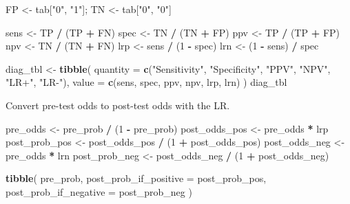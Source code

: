 \documentclass[
]{article}
\newenvironment{Shaded}{\begin{snugshade}}{\end{snugshade}}
\newcommand{\AttributeTok}[1]{\textcolor[rgb]{0.13,0.29,0.53}{#1}}
\newcommand{\DecValTok}[1]{\textcolor[rgb]{0.00,0.00,0.81}{#1}}
\newcommand{\FunctionTok}[1]{\textcolor[rgb]{0.13,0.29,0.53}{\textbf{#1}}}
\newcommand{\NormalTok}[1]{#1}
\newcommand{\OtherTok}[1]{\textcolor[rgb]{0.56,0.35,0.01}{#1}}
\newcommand{\SpecialCharTok}[1]{\textcolor[rgb]{0.81,0.36,0.00}{\textbf{#1}}}
\newcommand{\StringTok}[1]{\textcolor[rgb]{0.31,0.60,0.02}{#1}}
\begin{document}
\begin{Shaded}
\begin{Highlighting}[]
\NormalTok{FP }\OtherTok{\textless{}{-}}\NormalTok{ tab[}\StringTok{"0"}\NormalTok{, }\StringTok{"1"}\NormalTok{]; TN }\OtherTok{\textless{}{-}}\NormalTok{ tab[}\StringTok{"0"}\NormalTok{, }\StringTok{"0"}\NormalTok{]}

\NormalTok{sens }\OtherTok{\textless{}{-}}\NormalTok{ TP }\SpecialCharTok{/}\NormalTok{ (TP }\SpecialCharTok{+}\NormalTok{ FN)}
\NormalTok{spec }\OtherTok{\textless{}{-}}\NormalTok{ TN }\SpecialCharTok{/}\NormalTok{ (TN }\SpecialCharTok{+}\NormalTok{ FP)}
\NormalTok{ppv  }\OtherTok{\textless{}{-}}\NormalTok{ TP }\SpecialCharTok{/}\NormalTok{ (TP }\SpecialCharTok{+}\NormalTok{ FP)}
\NormalTok{npv  }\OtherTok{\textless{}{-}}\NormalTok{ TN }\SpecialCharTok{/}\NormalTok{ (TN }\SpecialCharTok{+}\NormalTok{ FN)}
\NormalTok{lrp  }\OtherTok{\textless{}{-}}\NormalTok{ sens }\SpecialCharTok{/}\NormalTok{ (}\DecValTok{1} \SpecialCharTok{{-}}\NormalTok{ spec)}
\NormalTok{lrn  }\OtherTok{\textless{}{-}}\NormalTok{ (}\DecValTok{1} \SpecialCharTok{{-}}\NormalTok{ sens) }\SpecialCharTok{/}\NormalTok{ spec}

\NormalTok{diag\_tbl }\OtherTok{\textless{}{-}} \FunctionTok{tibble}\NormalTok{(}
  \AttributeTok{quantity =} \FunctionTok{c}\NormalTok{(}\StringTok{"Sensitivity"}\NormalTok{, }\StringTok{"Specificity"}\NormalTok{,}
               \StringTok{"PPV"}\NormalTok{, }\StringTok{"NPV"}\NormalTok{, }\StringTok{"LR+"}\NormalTok{, }\StringTok{"LR{-}"}\NormalTok{),}
  \AttributeTok{value =} \FunctionTok{c}\NormalTok{(sens, spec, ppv, npv, lrp, lrn)}
\NormalTok{)}
\NormalTok{diag\_tbl}
\end{Highlighting}
\end{Shaded}

Convert pre-test odds to post-test odds with the LR.

\begin{Shaded}
\begin{Highlighting}[]
\NormalTok{pre\_odds }\OtherTok{\textless{}{-}}\NormalTok{ pre\_prob }\SpecialCharTok{/}\NormalTok{ (}\DecValTok{1} \SpecialCharTok{{-}}\NormalTok{ pre\_prob)}
\NormalTok{post\_odds\_pos }\OtherTok{\textless{}{-}}\NormalTok{ pre\_odds }\SpecialCharTok{*}\NormalTok{ lrp}
\NormalTok{post\_prob\_pos }\OtherTok{\textless{}{-}}\NormalTok{ post\_odds\_pos }\SpecialCharTok{/}\NormalTok{ (}\DecValTok{1} \SpecialCharTok{+}\NormalTok{ post\_odds\_pos)}
\NormalTok{post\_odds\_neg }\OtherTok{\textless{}{-}}\NormalTok{ pre\_odds }\SpecialCharTok{*}\NormalTok{ lrn}
\NormalTok{post\_prob\_neg }\OtherTok{\textless{}{-}}\NormalTok{ post\_odds\_neg }\SpecialCharTok{/}\NormalTok{ (}\DecValTok{1} \SpecialCharTok{+}\NormalTok{ post\_odds\_neg)}

\FunctionTok{tibble}\NormalTok{(}
\NormalTok{  pre\_prob,}
  \AttributeTok{post\_prob\_if\_positive =}\NormalTok{ post\_prob\_pos,}
  \AttributeTok{post\_prob\_if\_negative =}\NormalTok{ post\_prob\_neg}
\NormalTok{)}
\end{Highlighting}
\end{Shaded}
\end{document}
